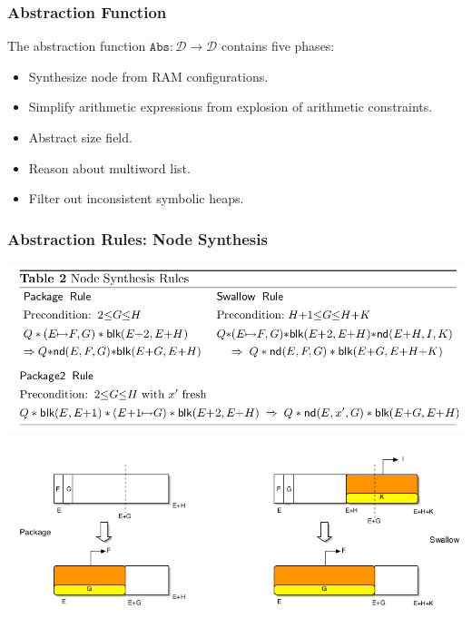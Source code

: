 \documentclass[aspectratio=1610, 13pt]{beamer}
\begin{document}
\begin{frame}\frametitle{Abstraction Function}
The abstraction function $\mathtt{Abs}: \mathcal{D}\rightarrow\mathcal{D}$ contains five phases:
\begin{itemize}
\item Synthesize node from RAM configurations.
\item Simplify arithmetic expressions from explosion of arithmetic constraints.

\item Abstract size field.
\item Reason about multiword list.
\item Filter out inconsistent symbolic heaps.
\end{itemize}

\end{frame}

\begin{frame}\frametitle{Abstraction Rules: Node Synthesis }
\begin{center}
\includegraphics[scale=0.4]{nodesynthesisrule.png}

\includegraphics[scale=0.4]{nodesynthesis.png}
\end{center}
\end{frame}
\end{document}

